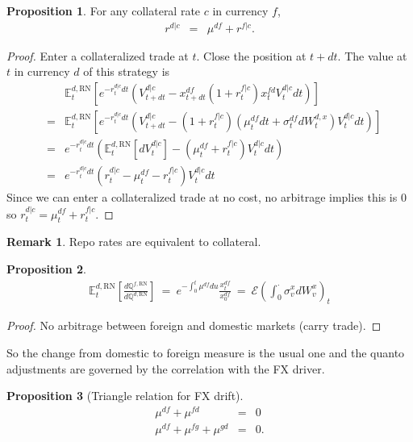 \documentclass[11pt,english]{amsart}
\newcommand{\RN}{\mathrm{RN}}
\newcommand{\EE}{\mathbb{E}}
\newcommand{\QQ}{\mathbb{Q}}
\theoremstyle{definition}
\newtheorem{prop}{Proposition}
\newtheorem{rema}{Remark}
\begin{document}
\begin{prop}
For any collateral rate $c$ in currency $f$,
\begin{eqnarray*}
	r^{d|c} &=& \mu^{df} + r^{f|c}.
\end{eqnarray*} 
\end{prop}

\begin{proof}
Enter a collateralized trade at $t$. Close the position at $t+dt$. The value at $t$ in currency $d$ of this strategy is 
\begin{eqnarray*}
	& & \EE_t^{d,\RN}\left[ e^{-r^{d|c}_tdt} \left(V^{d|c}_{t+dt} - x^{df}_{t+dt}(1+r^{f|c}_t)x^{fd}_{t}V^{d|c}_t dt\right) \right] \\
	&=&  \EE_t^{d,\RN}\left[ e^{-r^{d|c}_tdt} \left(V^{d|c}_{t+dt} - (1+r^{f|c}_t)\left(\mu^{df}_t dt + \sigma^{df}_t dW^{d,x}_t \right)V^{d|c}_t dt\right) \right] \\ 
	&=& e^{-r^{d|c}_tdt} \left(\EE_t^{d,\RN}[dV^{d|c}_{t}] - (\mu^{df}_t + r^{f|c}_t)V^{d|c}_tdt\right) \\
	&=& e^{-r^{d|c}_tdt} \left(r^{d|c}_t - \mu^{df}_t - r^{f|c}_t\right)V^{d|c}_t dt
\end{eqnarray*} 
Since we can enter a collateralized trade at no cost, no arbitrage implies this is 0 so $r^{d|c}_t = \mu^{df}_t + r^{f|c}_t$.
\end{proof}

\begin{rema}
Repo rates are equivalent to collateral.
\end{rema}


\begin{prop}
\begin{eqnarray}
	\EE^{d,\RN}_t\left[\frac{d\QQ^{f,\RN}}{d\QQ^{d,\RN}}\right] 
	~=~ e^{-\int_0^t \mu^{df} du} \frac{x^{df}_t}{x^{df}_0} 
	~=~ \mathcal{E}\left(\int_0^\cdot \sigma^x_v dW^x_v \right)_t 
\end{eqnarray} 
\end{prop}

\begin{proof}
No arbitrage between foreign and domestic markets (carry trade). 
\end{proof}

So the change from domestic to foreign measure is the usual one and the quanto adjustments are governed by the correlation with the FX driver.


\begin{prop}[Triangle relation for FX drift]
\begin{eqnarray*}
	\mu^{df} + \mu^{fd} &=& 0 \\
	\mu^{df} + \mu^{fg} + \mu^{gd}  &=& 0 .
\end{eqnarray*} 
\end{prop}
\end{document}
